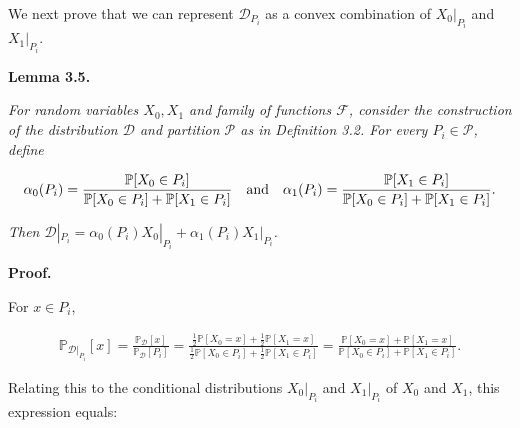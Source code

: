 We next prove that we can represent $\mathcal{D}_{P_{i}}$ as a convex combination of $X_{0}|_{P_{i}}$ and $X_{1}|_{P_{i}}$.\par





\par\medskip\noindent\textbf{
\textbf{Lemma 3.5}\textbf{.}
}\par



\emph{For random variables $X_{0},X_{1}$ and family of functions $\mathcal{F}$, consider the construction of the distribution $\mathcal{D}$ and partition $\mathcal{P}$ as in Definition 3.2. For every $P_{i}\in\mathcal{P}$, define}\par


\[\begin{gathered}
\alpha_{0}(P_{i})=\frac{\mathbb{P}[X_{0}\in P_{i}]}{\mathbb{P}[X_{0}\in P_{i}]+\mathbb{P}[X_{1}\in P_{i}]}\nobreak\ \nobreak\ \text{ and }\nobreak\ \nobreak\ \alpha_{1}(P_{i})=\frac{\mathbb{P}[X_{1}\in P_{i}]}{\mathbb{P}[X_{0}\in P_{i}]+\mathbb{P}[X_{1}\in P_{i}]}.
\end{gathered}\]


\emph{Then $\mathcal{D}|_{P_{i}}=\alpha_{0}(P_{i})X_{0}|_{P_{i}}+\alpha_{1}(P_{i})X_{1}|_{P_{i}}$.}\par







\par\medskip\noindent\textbf{Proof.}\par




For $x\in P_{i}$,\par


\[\begin{gathered}
\mathbb{P}_{\mathcal{D}|_{P_{i}}}[x]=\frac{\mathbb{P}_{\mathcal{D}}[x]}{\mathbb{P}_{\mathcal{D}}[P_{i}]}=\frac{\frac{1}{2}\mathbb{P}[X_{0}=x]+\frac{1}{2}\mathbb{P}[X_{1}=x]}{\frac{1}{2}\mathbb{P}[X_{0}\in P_{i}]+\frac{1}{2}\mathbb{P}[X_{1}\in P_{i}]}=\frac{\mathbb{P}[X_{0}=x]+\mathbb{P}[X_{1}=x]}{\mathbb{P}[X_{0}\in P_{i}]+\mathbb{P}[X_{1}\in P_{i}]}.
\end{gathered}\]


Relating this to the conditional distributions $X_{0}|_{P_{i}}$ and $X_{1}|_{P_{i}}$ of $X_{0}$ and $X_{1}$, this expression equals:\par


